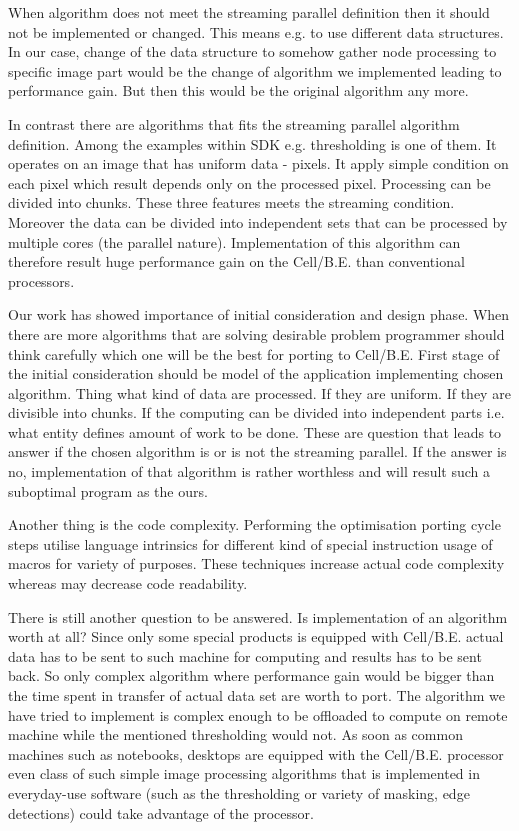 \par
When algorithm does not meet the streaming parallel definition then it should not be implemented or changed.
This means e.g. to use different data structures.
In our case, change of the data structure to somehow gather node processing to specific image part would be the change of algorithm we implemented leading to performance gain.
But then this would be the original algorithm any more.

\par
In contrast there are algorithms that fits the streaming parallel algorithm definition.
Among the examples within SDK e.g. thresholding is one of them.
It operates on an image that has uniform data - pixels.
It apply simple condition on each pixel which result depends only on the processed pixel.
Processing can be divided into chunks.
These three features meets the streaming condition.
Moreover the data can be divided into independent sets that can be processed by multiple cores (the parallel nature).
Implementation of this algorithm can therefore result huge performance gain on the Cell/B.E. than conventional processors.

\par
Our work has showed importance of initial consideration and design phase.
When there are more algorithms that are solving desirable problem programmer should think carefully which one will be the best for porting to Cell/B.E.
First stage of the initial consideration should be model of the application implementing chosen algorithm.
Thing what kind of data are processed.
If they are uniform.
If they are divisible into chunks.
If the computing can be divided into independent parts i.e. what entity defines amount of work to be done.
These are question that leads to answer if the chosen algorithm is or is not the streaming parallel.
If the answer is no, implementation of that algorithm is rather worthless and will result such a suboptimal program as the ours.

\par
Another thing is the code complexity.
Performing the optimisation porting cycle steps utilise language intrinsics for different kind of special instruction usage of macros for variety of purposes.
These techniques increase actual code complexity whereas may decrease code readability.

\par
There is still another question to be answered.
Is implementation of an algorithm worth at all?
Since only some special products is equipped with Cell/B.E. actual data has to be sent to such machine for computing and results has to be sent back.
So only complex algorithm where performance gain would be bigger than the time spent in transfer of actual data set are worth to port.
The algorithm we have tried to implement is complex enough to be offloaded to compute on remote machine while the mentioned thresholding would not.
As soon as common machines such as notebooks, desktops are equipped with the Cell/B.E. processor even class of such simple image processing algorithms that is implemented in everyday-use software (such as the thresholding or variety of masking, edge detections) could take advantage of the processor.

